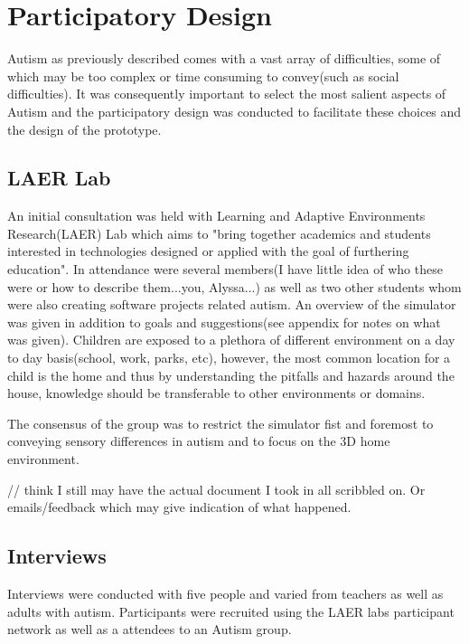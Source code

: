 \documentclass[11pt]{report}
\begin{document}
\chapter{Participatory Design}
Autism as previously described comes with a vast array of difficulties, some of which may be too complex or time consuming to convey(such as social difficulties). It was consequently important to select the most salient aspects of Autism and the participatory design was conducted to facilitate these choices and the design of the prototype. 

\section{LAER Lab}
An initial consultation was held with Learning and Adaptive Environments Research(LAER) Lab which aims to "bring together academics and students interested in technologies designed or applied with the goal of furthering education". In attendance were several members(I have little idea of who these were or how to describe them...you, Alyssa...) as well as two other students whom were also creating software projects related autism. An overview of the simulator was given in addition to goals and suggestions(see appendix for notes on what was given). Children are exposed to a plethora of different environment on a day to day basis(school, work, parks, etc), however, the most common location for a child is the home and thus by understanding the pitfalls and hazards around the house, knowledge should be transferable to other environments or domains. 

The consensus of the group was to restrict the simulator fist and foremost to conveying sensory differences in autism and to focus on the 3D home environment.

// think I still may have the actual document I took in all scribbled on. Or emails/feedback which may give indication of what happened.

\section{Interviews}
Interviews were conducted with five people and varied from teachers as well as adults with autism. Participants were recruited using the LAER labs participant network as well as a attendees to an Autism group.
\end{document}
